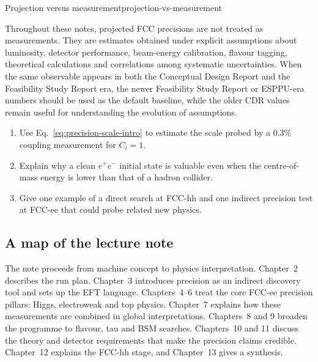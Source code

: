 \documentclass[11pt,a4paper]{article}
\numberwithin{equation}{section}
\begin{document}
\begin{remarkbox}{Projection versus measurement}{projection-vs-measurement}

Throughout these notes, projected FCC precisions are not treated as measurements. They are estimates obtained under explicit assumptions about luminosity, detector performance, beam-energy calibration, flavour tagging, theoretical calculations and correlations among systematic uncertainties. When the same observable appears in both the Conceptual Design Report and the Feasibility Study Report era, the newer Feasibility Study Report or ESPPU-era numbers should be used as the default baseline, while the older CDR values remain useful for understanding the evolution of assumptions.

\end{remarkbox}

\begin{guidedchecksbox}
\begin{enumerate}[leftmargin=1.6em]
\item Use Eq.~\eqref{eq:precision-scale-intro} to estimate the scale probed by a \(0.3\%\) coupling measurement for \(C_i=1\).
\item Explain why a clean \(e^+e^-\) initial state is valuable even when the centre-of-mass energy is lower than that of a hadron collider.
\item Give one example of a direct search at FCC-hh and one indirect precision test at FCC-ee that could probe related new physics.
\end{enumerate}
\end{guidedchecksbox}



\subsection{A map of the lecture note}
The note proceeds from machine concept to physics interpretation. Chapter~2 describes the run plan. Chapter~3 introduces precision as an indirect discovery tool and sets up the EFT language. Chapters~4--6 treat the core FCC-ee precision pillars: Higgs, electroweak and top physics. Chapter~7 explains how these measurements are combined in global interpretations. Chapters~8 and 9 broaden the programme to flavour, tau and BSM searches. Chapters~10 and 11 discuss the theory and detector requirements that make the precision claims credible. Chapter~12 explains the FCC-hh stage, and Chapter~13 gives a synthesis.
\end{document}
